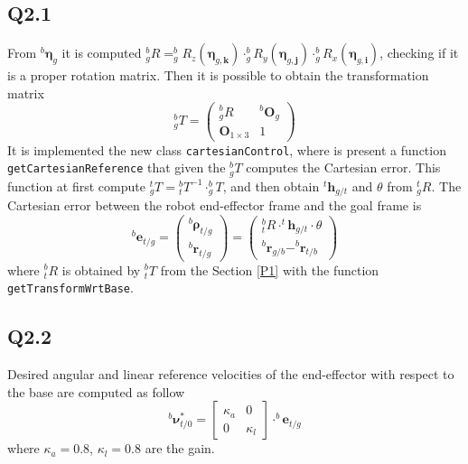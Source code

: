 \subsection{Q2.1}
From $^b \boldsymbol\eta_{g}$ it is computed $^b_g R = ^b_g R_z(\boldsymbol\eta_{g,\mathbf k}) \cdot ^b_g R_y(\boldsymbol\eta_{g,\mathbf j}) \cdot ^b_g R_x(\boldsymbol\eta_{g,\mathbf i})$, checking if it is a proper rotation matrix. Then it is possible to obtain the transformation matrix
\begin{equation*} \renewcommand{\arraystretch}{1.5}
	^b_g T = \begin{pmatrix}
		^b_g R & ^b \mathbf{O}_{g} \\
		\mathbf{O}_{1 \times 3} & 1
	\end{pmatrix}
\end{equation*}
It is implemented the new class \verb*|cartesianControl|, where is present a function \verb*|getCartesianReference| that given the $^b_g T$ computes the Cartesian error.
This function at first compute $^t_g T = {} ^b_t T^{-1} \cdot ^b_g T$, and then obtain $^t\mathbf{h}_{g/t}$ and $\theta$ from $^t_g R$.
The Cartesian error between the robot end-effector frame and the goal frame is
\begin{equation*} \renewcommand{\arraystretch}{1.5}
	^b \mathbf{e}_{t/g} = \begin{pmatrix}
		^b \boldsymbol\rho_{t/g} \\ 
		^b \mathbf{r}_{t/g}
	\end{pmatrix} = \begin{pmatrix}
		^b_t R \cdot ^t\mathbf{h}_{g/t} \cdot \theta \\ 
		^b \mathbf{r}_{g/b} - ^b \mathbf{r}_{t/b}
	\end{pmatrix}
\end{equation*}
where $^b_t R$ is obtained by $^b_t T$ from the Section \ref{P1} with the function \verb*|getTransformWrtBase|.

\subsection{Q2.2}
Desired angular and linear reference velocities of the end-effector  with respect to the base are computed as follow
\begin{equation*}
	^b \boldsymbol\nu^*_{t/0} = \begin{bmatrix}
		\kappa_a &0\\
		0 &\kappa_l
	\end{bmatrix}\cdot 	^b \mathbf{e}_{t/g}
\end{equation*}
where $\kappa_{a} = 0.8$, $\kappa_{l} = 0.8$ are the gain.

